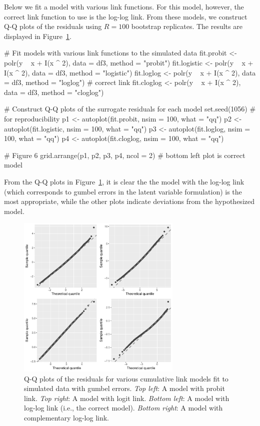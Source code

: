 Below we fit a model with various link functions. For this model, however, the correct link function to use is the log-log link. From these models, we construct Q-Q plots of the residuals using $R = 100$ bootstrap replicates. The results are displayed in Figure~\ref{fig:link}.
\begin{example}
# Fit models with various link functions to the simulated data
fit.probit <- polr(y ~ x + I(x ^ 2), data = df3, method = "probit")
fit.logistic <- polr(y ~ x + I(x ^ 2), data = df3, method = "logistic")
fit.loglog <- polr(y ~ x + I(x ^ 2), data = df3, method = "loglog")  # correct link
fit.cloglog <- polr(y ~ x + I(x ^ 2), data = df3, method = "cloglog")

# Construct Q-Q plots of the surrogate residuals for each model
set.seed(1056)  # for reproducibility
p1 <- autoplot(fit.probit, nsim = 100, what = "qq")
p2 <- autoplot(fit.logistic, nsim = 100, what = "qq")
p3 <- autoplot(fit.loglog, nsim = 100, what = "qq")
p4 <-  autoplot(fit.cloglog, nsim = 100, what = "qq")

# Figure 6
grid.arrange(p1, p2, p3, p4, ncol = 2)  # bottom left plot is correct model
\end{example}
From the Q-Q plots in Figure~\ref{fig:link}, it is clear the the model with the log-log link (which corresponds to gumbel errors in the latent variable formulation) is the most appropriate, while the other plots indicate deviations from the hypothesized model.

\begin{figure}[!htbp]
  \centering
  \includegraphics[width=0.7\textwidth]{link}
  \caption{Q-Q plots of the residuals for various cumulative link models fit to simulated data with gumbel errors. \textit{Top left}: A model with probit link. \textit{Top right}: A model with logit link. \textit{Bottom left}: A model with log-log link (i.e., the correct model). \textit{Bottom right}: A model with complementary log-log link.}  
  \label{fig:link}
\end{figure}

